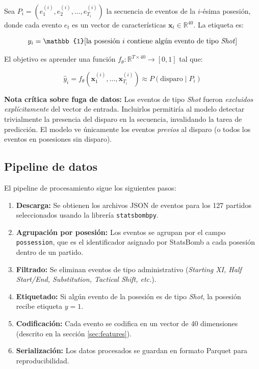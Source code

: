 \documentclass[12pt,a4paper]{article}
\newcommand{\code}[1]{\texttt{\small #1}}
\begin{document}
Sea $P_i = (e_1^{(i)}, e_2^{(i)}, \ldots, e_{T_i}^{(i)})$ la secuencia de eventos
de la $i$-ésima posesión, donde cada evento $e_t$ es un vector de características
$\mathbf{x}_t \in \mathbb{R}^{40}$. La etiqueta es:

\begin{equation}
    y_i = \mathbb{1}[\text{la posesión } i \text{ contiene algún evento de tipo \textit{Shot}}]
\end{equation}

El objetivo es aprender una función $f_\theta: \mathbb{R}^{T \times 40} \to [0,1]$ tal que:

\begin{equation}
    \hat{y}_i = f_\theta(\mathbf{x}_1^{(i)}, \ldots, \mathbf{x}_{T_i}^{(i)})
    \approx P(\text{disparo} \mid P_i)
\end{equation}

\textbf{Nota crítica sobre fuga de datos:} Los eventos de tipo \textit{Shot} fueron
\emph{excluidos explícitamente} del vector de entrada. Incluirlos permitiría al modelo
detectar trivialmente la presencia del disparo en la secuencia, invalidando la tarea
de predicción. El modelo ve únicamente los eventos \emph{previos} al disparo (o todos
los eventos en posesiones sin disparo).

\subsection{Pipeline de datos}

El pipeline de procesamiento sigue los siguientes pasos:

\begin{enumerate}[leftmargin=1.5em]
    \item \textbf{Descarga:} Se obtienen los archivos JSON de eventos para los 127
          partidos seleccionados usando la librería \code{statsbombpy}.
    \item \textbf{Agrupación por posesión:} Los eventos se agrupan por el campo
          \code{possession}, que es el identificador asignado por StatsBomb a cada
          posesión dentro de un partido.
    \item \textbf{Filtrado:} Se eliminan eventos de tipo administrativo
          (\textit{Starting XI, Half Start/End, Substitution, Tactical Shift, etc.}).
    \item \textbf{Etiquetado:} Si algún evento de la posesión es de tipo \textit{Shot},
          la posesión recibe etiqueta $y = 1$.
    \item \textbf{Codificación:} Cada evento se codifica en un vector de 40 dimensiones
          (descrito en la sección \ref{sec:features}).
    \item \textbf{Serialización:} Los datos procesados se guardan en formato Parquet
          para reproducibilidad.
\end{enumerate}
\end{document}
